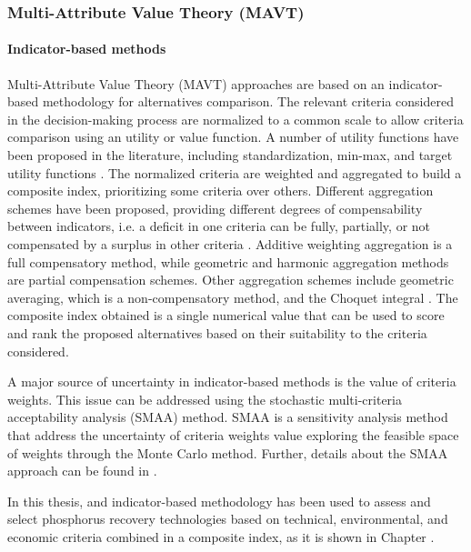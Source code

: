 \begin{refsection}[referencesCh1]
\subsubsection{Multi-Attribute Value Theory (MAVT)}
\paragraph{Indicator-based methods}
Multi-Attribute Value Theory (MAVT) approaches are based on an indicator-based methodology for alternatives comparison. The relevant criteria considered in the decision-making process are normalized to a common scale to allow criteria comparison using an utility or value function. A number of utility functions have been proposed in the literature, including standardization, min-max, and target utility functions \citep{HandbookCompositeIndicators}. 
The normalized criteria 
are weighted and aggregated to build a composite index, prioritizing some criteria over others. Different aggregation schemes have been proposed, providing different degrees of compensability between indicators, i.e. a deficit in one criteria can be fully, partially, or not compensated by a surplus in other criteria \citep{MarcoCinelli2020}. Additive weighting aggregation is a full compensatory method, while geometric and  harmonic aggregation methods are partial  compensation schemes. Other aggregation schemes include geometric averaging, which is a non-compensatory method, and the Choquet integral \citep{marichal2000determination}. The composite index obtained is a single numerical value that can be used to score and rank the proposed alternatives based on their suitability to the criteria considered. 

A major source of uncertainty in indicator-based methods is the value of criteria weights. This issue can be addressed using the stochastic multi-criteria acceptability analysis (SMAA) method. SMAA is a sensitivity analysis method that address the uncertainty of criteria weights value exploring the feasible space of weights through the Monte Carlo method. Further, details about the SMAA approach can be found in \citet{tervonen_implementing_2007}.

In this thesis, and indicator-based methodology has been used to assess and select phosphorus recovery technologies based on technical, environmental, and economic criteria combined in a composite index, as it is shown in Chapter \label{ch:Tool}.


\end{refsection}
